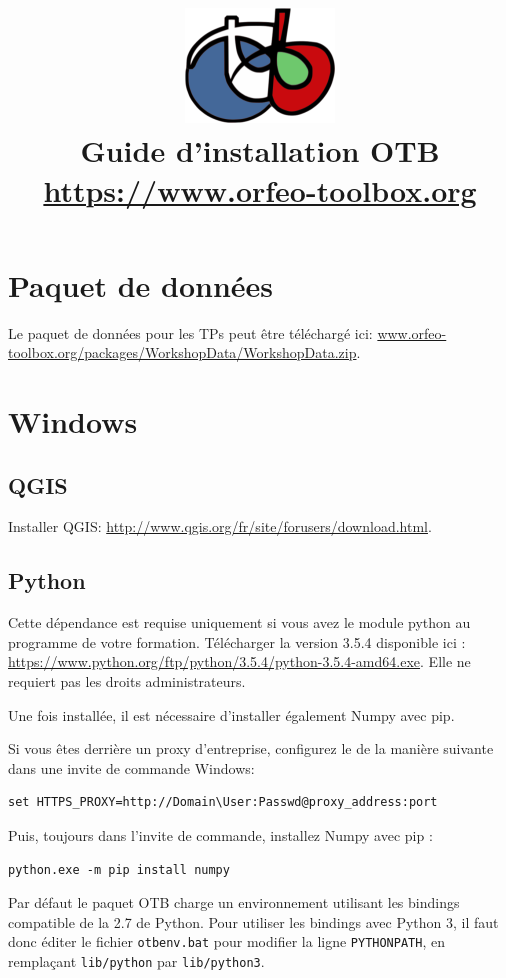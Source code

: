 \documentclass[10pt,a4paper]{article}
\title{\includegraphics[scale=1]{Art/otb-logo.png}\\
  Guide d'installation OTB\\
  {\small\url{https://www.orfeo-toolbox.org}}
}
\begin{document}
\maketitle

\tableofcontents

\clearpage
\section{Paquet de données}

Le paquet de données pour les TPs peut être téléchargé ici: \url{www.orfeo-toolbox.org/packages/WorkshopData/WorkshopData.zip}.

\section{Windows}

\subsection{QGIS}
Installer QGIS: \url{http://www.qgis.org/fr/site/forusers/download.html}.

\subsection{Python}

Cette dépendance est requise uniquement si vous avez le module python au programme de votre formation. Télécharger la version 3.5.4 disponible ici : \url{https://www.python.org/ftp/python/3.5.4/python-3.5.4-amd64.exe}. Elle ne requiert pas les droits administrateurs.

Une fois installée, il est nécessaire d'installer également Numpy avec pip.

Si vous êtes derrière un proxy d'entreprise, configurez le de la manière suivante dans une invite de commande Windows:

\begin{verbatim}
set HTTPS_PROXY=http://Domain\User:Passwd@proxy_address:port
\end{verbatim}

Puis, toujours dans l'invite de commande, installez Numpy avec pip :

\begin{verbatim}
python.exe -m pip install numpy
\end{verbatim}

Par défaut le paquet OTB charge un environnement utilisant les bindings
compatible de la 2.7 de Python. Pour utiliser les bindings avec Python 3, il
faut donc éditer le fichier \verb?otbenv.bat? pour modifier la ligne
\verb?PYTHONPATH?, en remplaçant \verb?lib/python? par \verb?lib/python3?.
\end{document}
